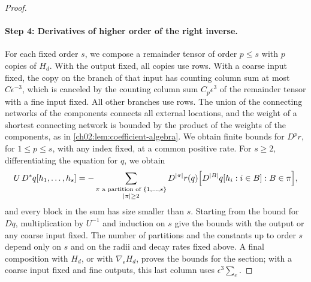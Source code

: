\begin{proof}
\paragraph{Step 4: Derivatives of higher order of the right inverse.}
For each fixed order $s$, we compose a remainder tensor of order $p\le s$ with $p$ copies of $H_d$. With the output fixed, all copies use rows. With a coarse input fixed, the copy on the branch of that input has counting column sum at most $C\epsilon^{-3}$, which is canceled by the counting column sum $C_p\epsilon^3$ of the remainder tensor with a fine input fixed. All other branches use rows. The union of the connecting networks of the components connects all external locations, and the weight of a shortest connecting network is bounded by the product of the weights of the components, as in \cref{ch02:lem:coefficient-algebra}. We obtain finite bounds for $D^pr$, for $1\le p\le s$, with any index fixed, at a common positive rate. For $s\ge2$, differentiating the equation for $q$, we obtain
\begin{equation}\label{ch06:eq:q-partitions}
 U\,D^sq[h_1,\ldots,h_s]=-\sum_{\substack{\pi\text{ a partition of }\{1,\ldots,s\}\\\lvert \pi\rvert\ge2}}D^{\lvert \pi\rvert}r(q)\Bigl[D^{\lvert B\rvert}q[h_i:i\in B]:B\in\pi\Bigr],
\end{equation}
and every block in the sum has size smaller than $s$. Starting from the bound for $Dq$, multiplication by $U^{-1}$ and induction on $s$ give the bounds with the output or any coarse input fixed. The number of partitions and the constants up to order $s$ depend only on $s$ and on the radii and decay rates fixed above. A final composition with $H_d$, or with $\nabla_\epsilon H_d$, proves the bounds for the section; with a coarse input fixed and fine outputs, this last column uses $\epsilon^3\sum_e$.


\end{proof}
